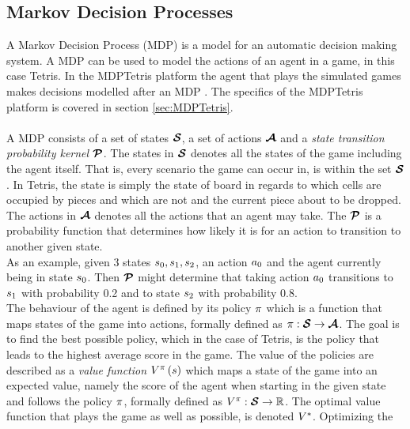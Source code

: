 \subsection{Markov Decision Processes \label{MDP}}

A Markov Decision Process (MDP) is a model for an automatic 
decision making system. A MDP can be used to model the actions 
of an agent in a game, in this case Tetris. 
In the MDPTetris platform the agent
that plays the simulated games makes decisions modelled
after an MDP \citep{mdptetris}. The specifics of the 
MDPTetris platform is covered in section \ref{sec:MDPTetris}.\\
\\
A MDP consists of a set of states $\boldsymbol{\mathcal{S}}$,
a set of actions $\boldsymbol{\mathcal{A}}$ and a 
\textit{state transition probability kernel} $\boldsymbol{\mathcal{P}}$.
The states in $\boldsymbol{\mathcal{S}}$ denotes all the states of the game
including the agent itself. That is, every scenario
the game can occur in, is within the set $\boldsymbol{\mathcal{S}}$. 
In Tetris, the state is simply the
state of board in regards to which cells are
occupied by pieces and which are not and the 
current piece about to be dropped.
The actions in $\boldsymbol{\mathcal{A}}$
denotes all the actions that an agent may take. The $\boldsymbol{\mathcal{P}}$ is
a probability function that determines how likely it is for an action 
to transition to another given state.\\
As an example, given 3 states 
$s_0, s_1, s_2$, an action $a_0$ and the 
agent currently being in state $s_0$. Then $\boldsymbol{\mathcal{P}}$
might determine that taking action $a_0$ transitions
to $s_1$ with probability 0.2 and to state $s_2$
with probability 0.8. \\
The behaviour of the agent is defined by its policy $\pi$
which is a function that maps states of the game into actions, formally
defined as $\pi : \boldsymbol{\mathcal{S}} \rightarrow \boldsymbol{\mathcal{A}}$.
The goal is to find the best possible policy, which in the case
of Tetris, is the policy that leads to the highest average score
in the game. The value of the policies are described as a 
\textit{value function} 
$V^{\pi}\left( s  \right)$ 
which maps a state
of the game into an expected value, namely the score of the 
agent when starting in the given state and follows
the policy $\pi$, formally defined as
$V^{\pi} : \boldsymbol{\mathcal{S}} \rightarrow \mathbb{R}$. 
The optimal value function that plays the game as well
as possible, is denoted $V^{*}$. Optimizing the 
